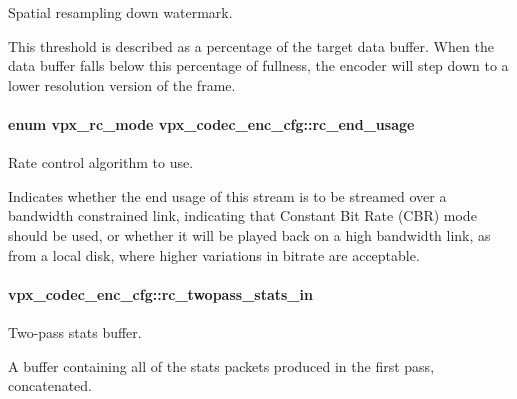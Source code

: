 Spatial resampling down watermark. 

This threshold is described as a percentage of the target data buffer. When the data buffer falls below this percentage of fullness, the encoder will step down to a lower resolution version of the frame. 
\paragraph[{\texorpdfstring{rc\+\_\+end\+\_\+usage}{rc_end_usage}}]{\setlength{\rightskip}{0pt plus 5cm}enum {\bf vpx\+\_\+rc\+\_\+mode} vpx\+\_\+codec\+\_\+enc\+\_\+cfg\+::rc\+\_\+end\+\_\+usage}\hypertarget{structvpx__codec__enc__cfg_a99c415edb6c6f909a095a57c3430a116}{}\label{structvpx__codec__enc__cfg_a99c415edb6c6f909a095a57c3430a116}


Rate control algorithm to use. 

Indicates whether the end usage of this stream is to be streamed over a bandwidth constrained link, indicating that Constant Bit Rate (C\+BR) mode should be used, or whether it will be played back on a high bandwidth link, as from a local disk, where higher variations in bitrate are acceptable. 
\paragraph[{\texorpdfstring{rc\+\_\+twopass\+\_\+stats\+\_\+in}{rc_twopass_stats_in}}]{ vpx\+\_\+codec\+\_\+enc\+\_\+cfg\+::rc\+\_\+twopass\+\_\+stats\+\_\+in}\hypertarget{structvpx__codec__enc__cfg_a1bd769247042e5806295f6e06d20f008}{}\label{structvpx__codec__enc__cfg_a1bd769247042e5806295f6e06d20f008}


Two-\/pass stats buffer. 

A buffer containing all of the stats packets produced in the first pass, concatenated. 
